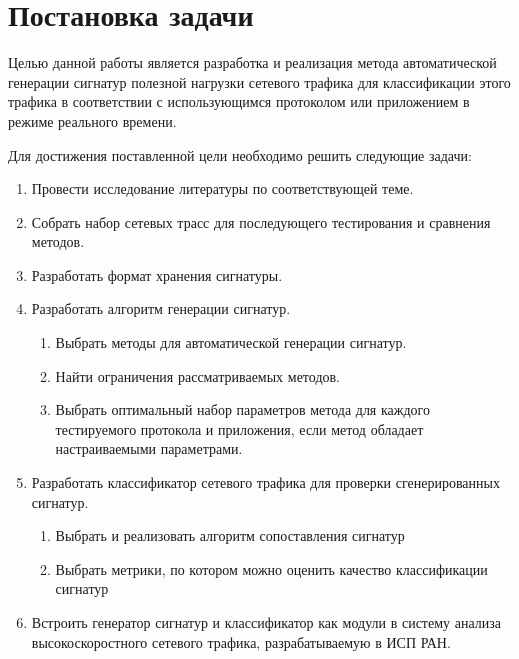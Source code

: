 \section{Постановка задачи}
\label{sec:Section1} 

Целью данной работы является разработка и реализация метода автоматической генерации сигнатур полезной нагрузки сетевого трафика
для классификации этого трафика в соответствии с использующимся протоколом или приложением в режиме реального времени.

Для достижения поставленной цели необходимо решить следующие задачи:

\begin{enumerate}
    \item Провести исследование литературы по соответствующей теме.
    \item Собрать набор сетевых трасс для последующего тестирования и сравнения методов.
    \item Разработать формат хранения сигнатуры.
    \item Разработать алгоритм генерации сигнатур.
    \begin{enumerate}
        \item Выбрать методы для автоматической генерации сигнатур.
        \item Найти ограничения рассматриваемых методов.
        \item Выбрать оптимальный набор параметров метода для каждого тестируемого протокола и приложения,
        если метод обладает настраиваемыми параметрами.
    \end{enumerate}
    \item Разработать классификатор сетевого трафика для проверки сгенерированных сигнатур.
    \begin{enumerate}
        \item Выбрать и реализовать алгоритм сопоставления сигнатур
        \item Выбрать метрики, по котором можно оценить качество классификации сигнатур
    \end{enumerate}
    \item Встроить генератор сигнатур и классификатор как модули в систему анализа высокоскоростного сетевого трафика, разрабатываемую в ИСП РАН.
\end{enumerate}

\newpage
